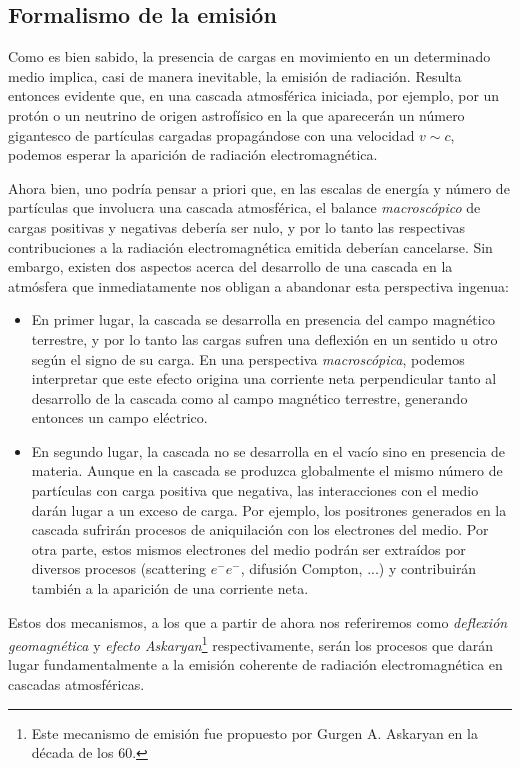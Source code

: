 \documentclass[12 pt, a4paper]{article} %
\numberwithin{equation}{section}
\numberwithin{figure}{section}
\begin{document}
	\subsection{Formalismo de la emisión}\label{sec31}
	Como es bien sabido, la presencia de cargas en movimiento en un determinado medio implica, casi de manera inevitable, la emisión de radiación. Resulta entonces evidente que, en una cascada atmosférica iniciada, por ejemplo, por un protón o un neutrino de origen astrofísico en la que aparecerán un número gigantesco de partículas cargadas propagándose con una velocidad $v\sim c$, podemos esperar la aparición de radiación electromagnética.
	
	Ahora bien, uno podría pensar a priori que, en las escalas de energía y número de partículas que involucra una cascada atmosférica, el balance \textit{macroscópico} de cargas positivas y negativas debería ser nulo, y por lo tanto las respectivas contribuciones a la radiación electromagnética emitida deberían cancelarse. Sin embargo, existen dos aspectos acerca del desarrollo de una cascada en la atmósfera que inmediatamente nos obligan a abandonar esta perspectiva ingenua:
	\begin{itemize}
		\item En primer lugar, la cascada se desarrolla en presencia del campo magnético terrestre, y por lo tanto las cargas sufren una deflexión en un sentido u otro según el signo de su carga. En una perspectiva \textit{macroscópica}, podemos interpretar que este efecto origina una corriente neta perpendicular tanto al desarrollo de la cascada como al campo magnético terrestre, generando entonces un campo eléctrico.
		\item En segundo lugar, la cascada no se desarrolla en el vacío sino en presencia de materia. Aunque en la cascada se produzca globalmente el mismo número de partículas con carga positiva que negativa, las interacciones con el medio darán lugar a un exceso de carga. Por ejemplo, los positrones generados en la cascada sufrirán procesos de aniquilación con los electrones del medio. Por otra parte, estos mismos electrones del medio podrán ser extraídos por diversos procesos (scattering $e^-e^-$, difusión Compton, ...) y contribuirán también a la aparición de una corriente neta. 
	\end{itemize}

Estos dos mecanismos, a los que a partir de ahora nos referiremos como \textit{deflexión geomagnética} y \textit{efecto Askaryan}\footnote{ Este mecanismo de emisión fue propuesto por Gurgen A. Askaryan en la década de los 60.} respectivamente, serán los procesos que darán lugar fundamentalmente a la emisión coherente de radiación electromagnética en cascadas atmosféricas.
\end{document}
